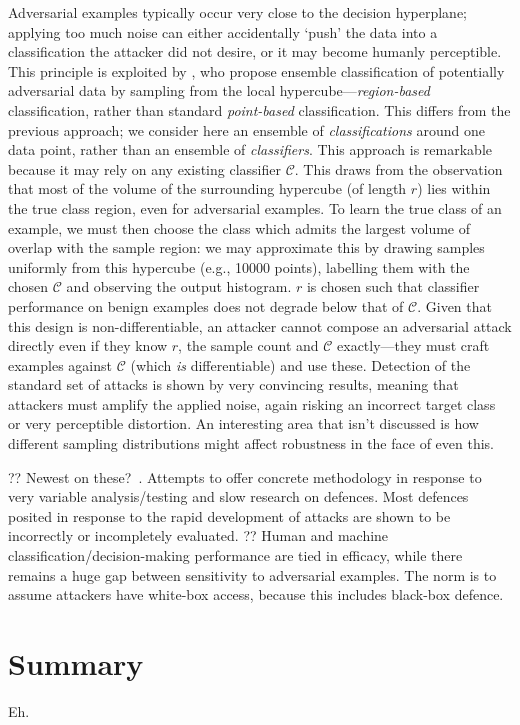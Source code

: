 Adversarial examples typically occur very close to the decision hyperplane; applying too much noise can either accidentally `push' the data into a classification the attacker did not desire, or it may become humanly perceptible.
This principle is exploited by \textcite{DBLP:conf/acsac/CaoG17}, who propose ensemble classification of potentially adversarial data by sampling from the local hypercube---\emph{region-based} classification, rather than standard \emph{point-based} classification.
This differs from the previous approach; we consider here an ensemble of \emph{classifications} around one data point, rather than an ensemble of \emph{classifiers}.
This approach is remarkable because it may rely on any existing classifier $\mathcal{C}$.
This draws from the observation that most of the volume of the surrounding hypercube (of length $r$) lies within the true class region, even for adversarial examples.
To learn the true class of an example, we must then choose the class which admits the largest volume of overlap with the sample region: we may approximate this by drawing samples uniformly from this hypercube (e.g., \num{10000} points), labelling them with the chosen $\mathcal{C}$ and observing the output histogram.
$r$ is chosen such that classifier performance on benign examples does not degrade below that of $\mathcal{C}$.
Given that this design is non-differentiable, an attacker cannot compose an adversarial attack directly even if they know $r$, the sample count and $\mathcal{C}$ exactly---they must craft examples against $\mathcal{C}$ (which \emph{is} differentiable) and use these.
Detection of the standard set of attacks \cite{DBLP:conf/sp/Carlini017} is shown by very convincing results, meaning that attackers must amplify the applied noise, again risking an incorrect target class or very perceptible distortion.
An interesting area that isn't discussed is how different sampling distributions might affect robustness in the face of even this.

?? Newest on these?~\parencite{DBLP:journals/corr/abs-1902-06705}. Attempts to offer concrete methodology in response to very variable analysis/testing and slow research on defences. Most defences posited in response to the rapid development of attacks are shown to be incorrectly or incompletely evaluated. ?? Human and machine classification/decision-making performance are tied in efficacy, while there remains a huge gap between sensitivity to adversarial examples. The norm is to assume attackers have white-box access, because this includes black-box defence.

\section{Summary}
Eh.
